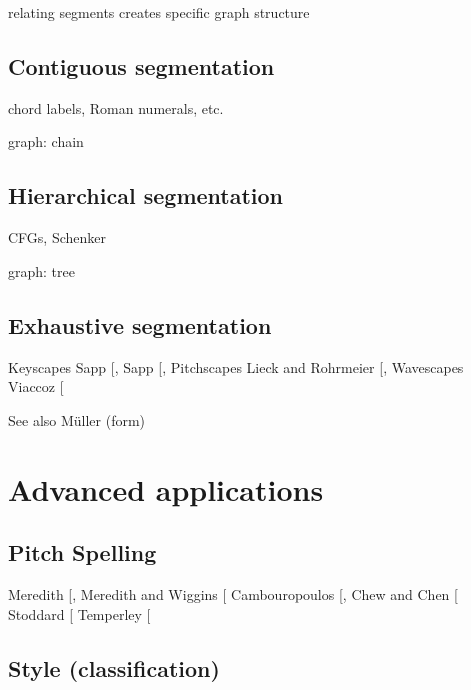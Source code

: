 \documentclass[letterpaper,10pt,english]{sphinxmanual}
\begin{document}
relating segments creates specific graph structure


\section{Contiguous segmentation}
\label{\detokenize{5_segmentation:contiguous-segmentation}}
chord labels, Roman numerals, etc.

graph: chain


\section{Hierarchical segmentation}
\label{\detokenize{5_segmentation:hierarchical-segmentation}}
CFGs, Schenker

graph: tree


\section{Exhaustive segmentation}
\label{\detokenize{5_segmentation:exhaustive-segmentation}}
Keyscapes Sapp {[}\sphinxcite{8_bibliography:id15}{]}, Sapp {[}\sphinxcite{8_bibliography:id16}{]},
Pitchscapes Lieck and Rohrmeier {[}\sphinxcite{8_bibliography:id14}{]},
Wavescapes Viaccoz  {[}\sphinxcite{8_bibliography:id17}{]}

See also Müller (form)


\chapter{Advanced applications}
\label{\detokenize{6_advanced:advanced-applications}}\label{\detokenize{6_advanced::doc}}

\section{Pitch Spelling}
\label{\detokenize{6_advanced:pitch-spelling}}\label{\detokenize{6_advanced:id1}}
Meredith {[}\sphinxcite{8_bibliography:id9}{]}, Meredith and Wiggins {[}\sphinxcite{8_bibliography:id8}{]}
Cambouropoulos {[}\sphinxcite{8_bibliography:id10}{]}, Chew and Chen {[}\sphinxcite{8_bibliography:id11}{]}
Stoddard  {[}\sphinxcite{8_bibliography:id12}{]}
Temperley {[}\sphinxcite{8_bibliography:id13}{]}


\section{Style (classification)}
\label{\detokenize{6_advanced:style-classification}}
\end{document}
